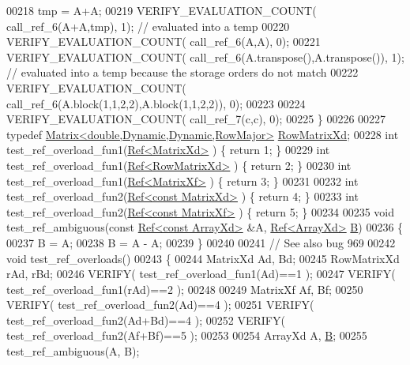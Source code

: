 \begin{DoxyCode}
00218   tmp = A+A;
00219   VERIFY\_EVALUATION\_COUNT( call\_ref\_6(A+A,tmp), 1);                \textcolor{comment}{// evaluated into a temp}
00220   VERIFY\_EVALUATION\_COUNT( call\_ref\_6(A,A), 0);
00221   VERIFY\_EVALUATION\_COUNT( call\_ref\_6(A.transpose(),A.transpose()), 1);      \textcolor{comment}{// evaluated into a temp
       because the storage orders do not match}
00222   VERIFY\_EVALUATION\_COUNT( call\_ref\_6(A.block(1,1,2,2),A.block(1,1,2,2)), 0);
00223   
00224   VERIFY\_EVALUATION\_COUNT( call\_ref\_7(c,c), 0);
00225 \}
00226 
00227 \textcolor{keyword}{typedef} \hyperlink{group___core___module_class_eigen_1_1_matrix}{Matrix<double,Dynamic,Dynamic,RowMajor>} 
      \hyperlink{group___core___module_class_eigen_1_1_matrix}{RowMatrixXd};
00228 \textcolor{keywordtype}{int} test\_ref\_overload\_fun1(\hyperlink{group___core___module_class_eigen_1_1_ref}{Ref<MatrixXd>} )       \{ \textcolor{keywordflow}{return} 1; \}
00229 \textcolor{keywordtype}{int} test\_ref\_overload\_fun1(\hyperlink{group___core___module_class_eigen_1_1_ref}{Ref<RowMatrixXd>} )    \{ \textcolor{keywordflow}{return} 2; \}
00230 \textcolor{keywordtype}{int} test\_ref\_overload\_fun1(\hyperlink{group___core___module_class_eigen_1_1_ref}{Ref<MatrixXf>} )       \{ \textcolor{keywordflow}{return} 3; \}
00231 
00232 \textcolor{keywordtype}{int} test\_ref\_overload\_fun2(\hyperlink{group___core___module_class_eigen_1_1_ref}{Ref<const MatrixXd>} ) \{ \textcolor{keywordflow}{return} 4; \}
00233 \textcolor{keywordtype}{int} test\_ref\_overload\_fun2(\hyperlink{group___core___module_class_eigen_1_1_ref}{Ref<const MatrixXf>} ) \{ \textcolor{keywordflow}{return} 5; \}
00234 
00235 \textcolor{keywordtype}{void} test\_ref\_ambiguous(\textcolor{keyword}{const} \hyperlink{group___core___module_class_eigen_1_1_ref}{Ref<const ArrayXd>} &A, 
      \hyperlink{group___core___module_class_eigen_1_1_ref}{Ref<ArrayXd>} \hyperlink{group___core___module_class_eigen_1_1_matrix}{B})
00236 \{
00237   B = A;
00238   B = A - A;
00239 \}
00240 
00241 \textcolor{comment}{// See also bug 969}
00242 \textcolor{keywordtype}{void} test\_ref\_overloads()
00243 \{
00244   MatrixXd Ad, Bd;
00245   RowMatrixXd rAd, rBd;
00246   VERIFY( test\_ref\_overload\_fun1(Ad)==1 );
00247   VERIFY( test\_ref\_overload\_fun1(rAd)==2 );
00248   
00249   MatrixXf Af, Bf;
00250   VERIFY( test\_ref\_overload\_fun2(Ad)==4 );
00251   VERIFY( test\_ref\_overload\_fun2(Ad+Bd)==4 );
00252   VERIFY( test\_ref\_overload\_fun2(Af+Bf)==5 );
00253   
00254   ArrayXd A, \hyperlink{group___core___module_class_eigen_1_1_matrix}{B};
00255   test\_ref\_ambiguous(A, B);

\end{DoxyCode}
